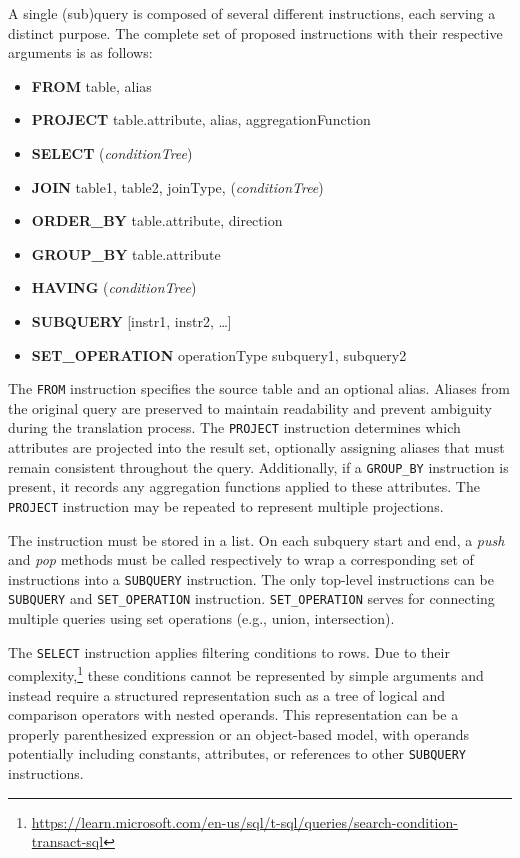 A single (sub)query is composed of several different instructions, each serving a distinct purpose. The complete set of proposed instructions with their respective arguments is as follows:
\begin{itemize}
    \item \textbf{FROM} table, alias
    \item \textbf{PROJECT} table.attribute, alias, aggregationFunction
    \item \textbf{SELECT} (\textit{conditionTree})
    \item \textbf{JOIN} table1, table2, joinType, (\textit{conditionTree})
    \item \textbf{ORDER\_BY} table.attribute, direction
    \item \textbf{GROUP\_BY} table.attribute
    \item \textbf{HAVING} (\textit{conditionTree})
    \item \textbf{SUBQUERY} [instr1, instr2, \ldots]
    \item \textbf{SET\_OPERATION} operationType subquery1, subquery2
\end{itemize}

The \texttt{FROM} instruction specifies the source table and an optional alias. Aliases from the original query are preserved to maintain readability and prevent ambiguity during the translation process. The \texttt{PROJECT} instruction determines which attributes are projected into the result set, optionally assigning aliases that must remain consistent throughout the query. Additionally, if a \texttt{GROUP\_BY} instruction is present, it records any aggregation functions applied to these attributes. The \texttt{PROJECT} instruction may be repeated to represent multiple projections.

The instruction must be stored in a list. On each subquery start and end, a \textit{push} and \textit{pop} methods must be called respectively to wrap a corresponding set of instructions into a \texttt{SUBQUERY} instruction. The only top-level instructions can be \texttt{SUBQUERY} and \texttt{SET\_OPERATION} instruction. \texttt{SET\_OPERATION} serves for connecting multiple queries using set operations (e.g., union, intersection).

The \texttt{SELECT} instruction applies filtering conditions to rows. Due to their complexity,\footnote{\url{https://learn.microsoft.com/en-us/sql/t-sql/queries/search-condition-transact-sql}} these conditions cannot be represented by simple arguments and instead require a structured representation such as a tree of logical and comparison operators with nested operands. This representation can be a properly parenthesized expression or an object-based model, with operands potentially including constants, attributes, or references to other \texttt{SUBQUERY} instructions.

